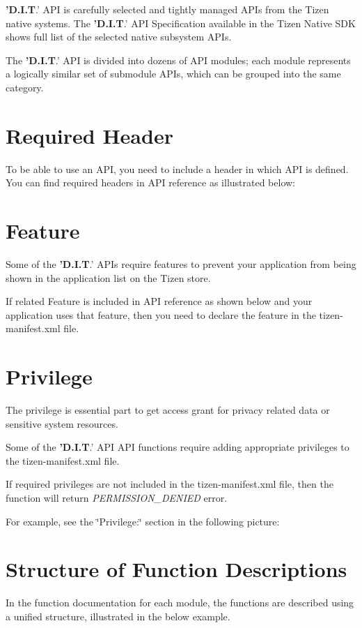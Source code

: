 {\bfseries 'D.\-I.\-T}.' A\-P\-I is carefully selected and tightly managed A\-P\-Is from the Tizen native systems. The {\bfseries 'D.\-I.\-T}.' A\-P\-I Specification available in the Tizen Native S\-D\-K shows full list of the selected native subsystem A\-P\-Is. \par
The {\bfseries 'D.\-I.\-T}.' A\-P\-I is divided into dozens of A\-P\-I modules; each module represents a logically similar set of submodule A\-P\-Is, which can be grouped into the same category.\par
\section{Required Header}\label{index_intro}
To be able to use an A\-P\-I, you need to include a header in which A\-P\-I is defined. You can find required headers in A\-P\-I reference as illustrated below\-: \par
 \par
 \section{Feature}\label{index_feature}
Some of the {\bfseries 'D.\-I.\-T}.' A\-P\-Is require features to prevent your application from being shown in the application list on the Tizen store. \par
If related Feature is included in A\-P\-I reference as shown below and your application uses that feature, then you need to declare the feature in the tizen-\/manifest.\-xml file. \par
 \par
 \section{Privilege}\label{index_privilege}
The privilege is essential part to get access grant for privacy related data or sensitive system resources. \par
Some of the {\bfseries 'D.\-I.\-T}.' A\-P\-I A\-P\-I functions require adding appropriate privileges to the tizen-\/manifest.\-xml file. \par
If required privileges are not included in the tizen-\/manifest.\-xml file, then the function will return {\itshape P\-E\-R\-M\-I\-S\-S\-I\-O\-N\-\_\-\-D\-E\-N\-I\-E\-D} error. \par
For example, see the \char`\"{}\-Privilege\-:\char`\"{} section in the following picture\-: \par
 \par
 \section{Structure of Function Descriptions}\label{index_structure}
In the function documentation for each module, the functions are described using a unified structure, illustrated in the below example. \par
 \par
